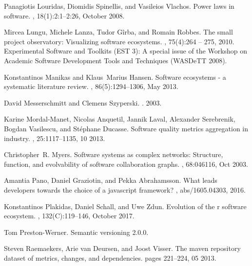 \documentclass[10pt,conference]{IEEEtran}
\begin{document}
\begin{thebibliography}{10}
  Panagiotis Louridas, Diomidis Spinellis, and Vasileios Vlachos.
  \newblock Power laws in software.
  , 18(1):2:1--2:26, October
    2008.
  
  Mircea Lungu, Michele Lanza, Tudor Gîrba, and Romain Robbes.
  \newblock The small project observatory: Visualizing software ecosystems.
  , 75(4):264 -- 275, 2010.
  \newblock Experimental Software and Toolkits (EST 3): A special issue of the
    Workshop on Academic Software Development Tools and Techniques (WASDeTT
    2008).
  
  Konstantinos Manikas and Klaus~Marius Hansen.
  \newblock Software ecosystems - a systematic literature review.
  , 86(5):1294--1306, May 2013.
  
  David Messerschmitt and Clemens Szyperski.
  .
   2003.
  
  Karine Mordal-Manet, Nicolas Anquetil, Jannik Laval, Alexander Serebrenik,
    Bogdan Vasilescu, and Stéphane Ducasse.
  \newblock Software quality metrics aggregation in industry.
  , 25:1117--1135, 10
    2013.
  
  Christopher~R. Myers.
  \newblock Software systems as complex networks: Structure, function, and
    evolvability of software collaboration graphs.
  , 68:046116, Oct 2003.
  
  Amantia Pano, Daniel Graziotin, and Pekka Abrahamsson.
  \newblock What leads developers towards the choice of a javascript framework?
  , abs/1605.04303, 2016.
  
  Konstantinos Plakidas, Daniel Schall, and Uwe Zdun.
  \newblock Evolution of the r software ecosystem.
  , 132(C):119--146, October 2017.
  
  Tom Preston-Werner.
  \newblock Semantic versioning 2.0.0.
  
  Steven Raemaekers, Arie van Deursen, and Joost Visser.
  \newblock The maven repository dataset of metrics, changes, and dependencies.
  \newblock pages 221--224, 05 2013.
  

\end{thebibliography}
\end{document}
